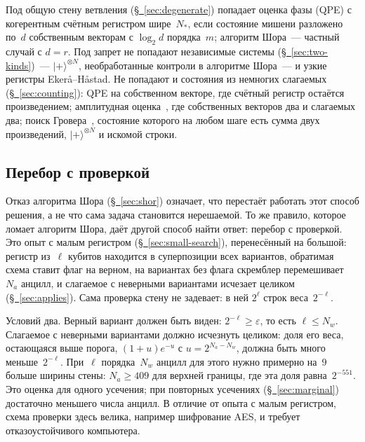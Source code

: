 \documentclass[11pt,a4paper]{article}
\begin{document}
Под общую стену ветвления (\hyperref[sec:degenerate]{\S~\ref*{sec:degenerate}}) попадает оценка фазы (QPE) с когерентным счётным регистром шире~$N_*$, если состояние мишени разложено по~$d$ собственным векторам с $\log_2 d$ порядка~$m$; алгоритм Шора~--- частный случай с $d=r$. Под запрет не попадают независимые системы (\hyperref[sec:two-kinds]{\S~\ref*{sec:two-kinds}})~--- $|+\rangle^{\otimes N}$, необработанные контроли в алгоритме Шора~--- и узкие регистры Ekerå--Håstad. Не попадают и состояния из немногих слагаемых (\hyperref[sec:counting]{\S~\ref*{sec:counting}}): QPE на собственном векторе, где счётный регистр остаётся произведением; амплитудная оценка~\cite{brassard2002}, где собственных векторов два и слагаемых два; поиск Гровера~\cite{grover1996}, состояние которого на любом шаге есть сумма двух произведений, $|+\rangle^{\otimes N}$ и искомой строки.

\subsection{Перебор с проверкой}
\label{sec:search}

Отказ алгоритма Шора (\hyperref[sec:shor]{\S~\ref*{sec:shor}}) означает, что перестаёт работать этот способ решения, а не что сама задача становится нерешаемой. То же правило, которое ломает алгоритм Шора, даёт другой способ найти ответ: перебор с проверкой. Это опыт с малым регистром (\hyperref[sec:small-search]{\S~\ref*{sec:small-search}}), перенесённый на большой: регистр из~$\ell$ кубитов находится в суперпозиции всех вариантов, обратимая схема ставит флаг на верном, на вариантах без флага скремблер перемешивает~$N_a$ анцилл, и слагаемое с неверными вариантами исчезает целиком (\hyperref[sec:applies]{\S~\ref*{sec:applies}}). Сама проверка стену не задевает: в ней $2^\ell$ строк веса~$2^{-\ell}$.

Условий два. Верный вариант должен быть виден: $2^{-\ell}\ge\varepsilon$, то есть $\ell\le N_w$. Слагаемое с неверными вариантами должно исчезнуть целиком: доля его веса, остающаяся выше порога, $(1+u)e^{-u}$ с $u=2^{N_a-N_w}$, должна быть много меньше~$2^{-\ell}$. При~$\ell$ порядка~$N_w$ анцилл для этого нужно примерно на~$9$ больше ширины стены: $N_a\ge409$ для верхней границы, где эта доля равна~$2^{-551}$. Это оценка для одного усечения; при повторных усечениях (\hyperref[sec:marginal]{\S~\ref*{sec:marginal}}) достаточно меньшего числа анцилл. В отличие от опыта с малым регистром, схема проверки здесь велика, например шифрование AES, и требует отказоустойчивого компьютера.
\end{document}
